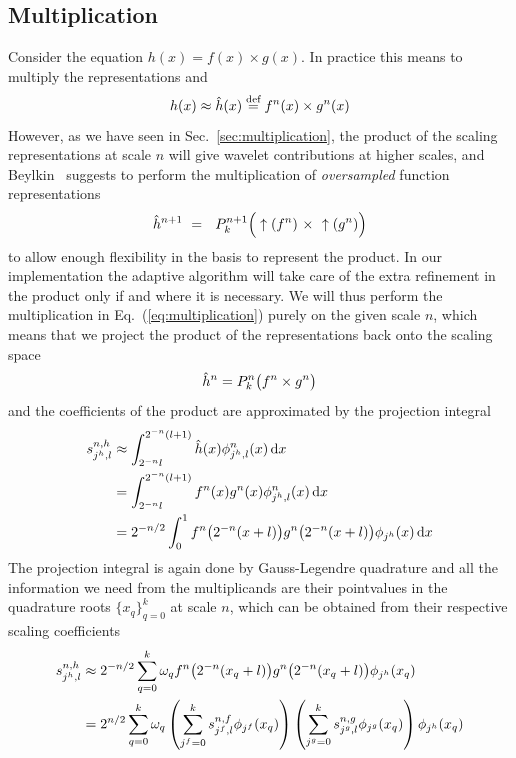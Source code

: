 \subsection{Multiplication}
Consider the equation $h(x) = f(x)\times g(x)$. In practice this means to
multiply the representations  and 
\begin{equation}
    \label{eq:multiplication}
    h(x) \approx \hat{h}(x) \stackrel{\text{def}}{\hbox{=}} {f}^{n}(x) 
	\times {g}^{n}(x)\\
\end{equation}
However, as we have seen in Sec.~\ref{sec:multiplication}, the product of the
scaling representations at scale $n$ will give wavelet contributions at higher
scales, and Beylkin~\cite{Beylkin:1992}
suggests to perform the multiplication of \emph{oversampled} function representations 
\begin{equation}
    \scalingrep{\hat{h}}{n+1}\ =\ \ \scalingproj{n+1}\Big( 
	\uparrow(\scalingrep{f}{n})\ \times\ \uparrow(\scalingrep{g}{n}) \Big)
\end{equation}
to allow enough flexibility in the basis to represent the product. In our 
implementation the adaptive algorithm will take care of the extra refinement in the 
product only if and where it is necessary. We will thus perform the multiplication 
in Eq.~(\ref{eq:multiplication}) purely on the given scale $n$, which means that we
project the product of the representations back onto the scaling space 
\begin{equation}
    {\hat{h}}^{n} = 
	{P}_{k}^{n}\big({f}^{n} \times {g}^{n}\big)
\end{equation}
and the coefficients of the product are approximated by the projection integral
\begin{align}
    s^{n,h}_{j^h,l} 
	&\approx \int_{2^{-n}l}^{2^{-n}(l+1)}
	    \hat{h}(x)\phi_{j^h,l}^n(x)\,\mathrm{d} x\\
	&= \int_{2^{-n}l}^{2^{-n}(l+1)}
	    {f}^{n}(x){g}^{n}(x)\phi^n_{j^h,l}(x)\,\mathrm{d} x\\
	&= 2^{-n/2} \int_0^1
	    {f}^{n}\big(2^{-n}(x+l)\big)
	    {g}^{n}\big(2^{-n}(x+l)\big)\phi_{j^h}(x)\,\mathrm{d} x
    \label{eq:multexpansion}
\end{align}
The projection integral is again done by Gauss-Legendre quadrature and all the 
information we need from the multiplicands are their pointvalues in the quadrature 
roots $\lbrace x_q\rbrace_{q=0}^k$ at scale $n$, which can be obtained from their
respective scaling coefficients
\begin{align}
    s^{n,h}_{j^h,l} &\approx 2^{-n/2}
	\sum_{q=0}^k \omega_q {f}^{n}\big(2^{-n}(x_q+l)\big)
        {g}^{n}\big(2^{-n}(x_q+l)\big) \phi_{j^h}(x_q)\\
	&= 2^{n/2}\sum_{q=0}^k \omega_q 
	\left(\sum_{j^f=0}^ks^{n,f}_{j^f,l}\phi_{j^f}(x_q)\right)
	\left(\sum_{j^g=0}^ks^{n,g}_{j^g,l}\phi_{j^g}(x_q)\right)
	\phi_{j^h}(x_q)
	\label{eq:nmult}
\end{align}

